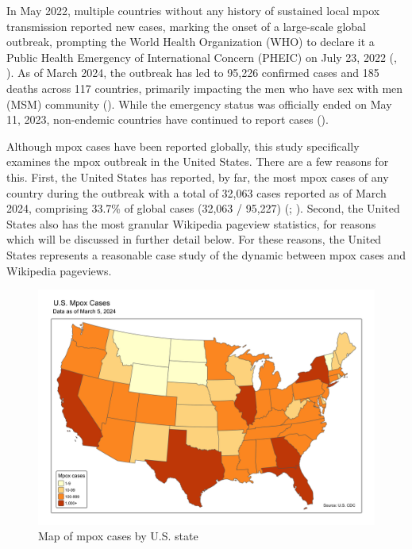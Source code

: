 \documentclass[
  12pt,
]{article}
\begin{document}
In May 2022, multiple countries without any history of sustained local
mpox transmission reported new cases, marking the onset of a large-scale
global outbreak, prompting the World Health Organization (WHO) to
declare it a Public Health Emergency of International Concern (PHEIC) on
July 23, 2022 (,
). As of March 2024, the outbreak has led
to 95,226 confirmed cases and 185 deaths across 117 countries, primarily
impacting the men who have sex with men (MSM) community
().
While the emergency status was officially ended on May 11, 2023,
non-endemic countries have continued to report cases
().

Although mpox cases have been reported globally, this study specifically
examines the mpox outbreak in the United States. There are a few reasons
for this. First, the United States has reported, by far, the most mpox
cases of any country during the outbreak with a total of 32,063 cases
reported as of March 2024, comprising 33.7\% of global cases (32,063 /
95,227) (; ). Second, the United States also has the most granular Wikipedia
pageview statistics, for reasons which will be discussed in further
detail below. For these reasons, the United States represents a
reasonable case study of the dynamic between mpox cases and Wikipedia
pageviews.

\begin{figure}[H]

{\centering \includegraphics{images/cases-USA-map.png}

}

\caption{Map of mpox cases by U.S. state}

\end{figure}%
\end{document}
